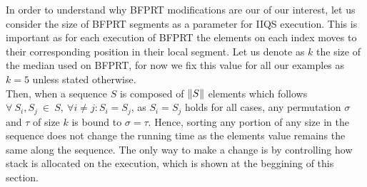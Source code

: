 In order to understand why BFPRT modifications are our of our interest, let us consider the size of BFPRT segments as a parameter for IIQS execution. This is important as for each execution of BFPRT the elements on each index moves to their corresponding position in their local segment. Let us denote as $k$ the size of the median used on BFPRT, for now we fix this value for all our examples as $k=5$ unless stated otherwise.\\

Then, when a sequence $S$ is composed of $\lVert S\rVert$ elements which follows $\forall~S_i, S_j~\in~S,~\forall i \neq j : S_i=S_j$, as $S_i=S_j$ holds for all cases, any permutation $\sigma$ and $\tau$ of size $k$ is bound to $\sigma = \tau$. Hence, sorting any portion of any size in the sequence does not change the running time as the elements value remains the same along the sequence. The only way to make a change is by controlling how stack is allocated on the execution, which is shown at the beggining of this section.\\

\FloatBarrier